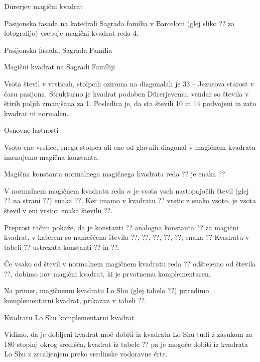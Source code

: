 \documentclass[a4paper,12pt]{article}
\begin{document}
Dürerjev magični kvadrat

Pasijonska fasada na katedrali Sagrada família v Barceloni
(glej sliko ?? za fotografijo) vsebuje magični kvadrat reda 4.

Pasijonska fasada, Sagrada Família

Magični kvadrat na Sagradi Famíliji

Vsota števil v vrsticah, stolpcih oziroma na diagonalah je 33 -- Jezusova starost
v času pasijona. Strukturno je kvadrat podoben Dürerjevemu, vendar so števila
v štirih poljih zmanjšana za 1. Posledica je, da sta števili 10 in 14 podvojeni
in zato kvadrat ni normalen.


Osnovne lastnosti

   Vsoto ene vrstice, enega stolpca ali ene od glavnih diagonal
   v magičnem kvadratu imenujemo magična konstanta.

   Magična konstanta normalnega magičnega kvadrata reda ??
   je enaka
   ??

   V normalnem magičnem kvadratu reda $n$ je vsota vseh nastopajočih
   števil (glej ?? na strani ??) enaka
   ??. Ker imamo
   v kvadratu ?? vrstic z enako vsoto, je vsota števil v eni vrstici
   enaka številu ??.

Preprost račun pokaže, da je konstanti ?? analogna konstanta
?? za magični kvadrat, v katerem so nameščena števila
??, ??, ??, ??, ??, enaka
??
Kvadratu v tabeli ?? ustrezata konstanti ?? in ??.

   Če vsako od števil v normalnem magičnem kvadratu reda ?? odštejemo
   od števila ??, dobimo nov magični kvadrat, ki je prvotnemu
   komplementaren.

Na primer, magičnemu kvadratu Lo Shu (glej tabelo ??) priredimo
komplementarni kvadrat, prikazan v tabeli ??.

Kvadratu Lo Shu komplementarni kvadrat

Vidimo, da je dobljeni kvadrat moč dobiti iz kvadrata Lo Shu tudi z zasukom za
180 stopinj okrog središča, kvadrat iz tabele ?? pa je mogoče dobiti
iz kvadrata Lo Shu z zrcaljenjem preko sredinske vodoravne črte.
\end{document}
